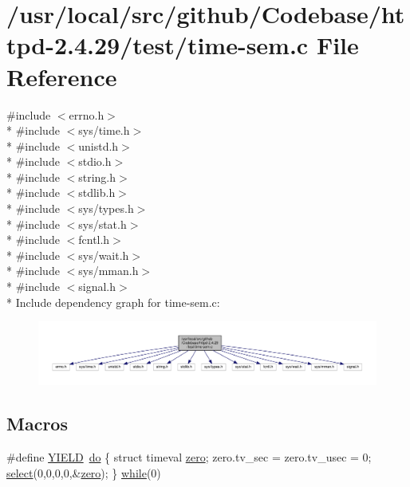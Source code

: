\hypertarget{time-sem_8c}{}\section{/usr/local/src/github/\+Codebase/httpd-\/2.4.29/test/time-\/sem.c File Reference}
\label{time-sem_8c}
{\ttfamily \#include $<$errno.\+h$>$}\\*
{\ttfamily \#include $<$sys/time.\+h$>$}\\*
{\ttfamily \#include $<$unistd.\+h$>$}\\*
{\ttfamily \#include $<$stdio.\+h$>$}\\*
{\ttfamily \#include $<$string.\+h$>$}\\*
{\ttfamily \#include $<$stdlib.\+h$>$}\\*
{\ttfamily \#include $<$sys/types.\+h$>$}\\*
{\ttfamily \#include $<$sys/stat.\+h$>$}\\*
{\ttfamily \#include $<$fcntl.\+h$>$}\\*
{\ttfamily \#include $<$sys/wait.\+h$>$}\\*
{\ttfamily \#include $<$sys/mman.\+h$>$}\\*
{\ttfamily \#include $<$signal.\+h$>$}\\*
Include dependency graph for time-\/sem.c\+:
\nopagebreak
\begin{figure}[H]
\begin{center}
\leavevmode
\includegraphics[width=350pt]{time-sem_8c__incl}
\end{center}
\end{figure}
\subsection*{Macros}
\begin{DoxyCompactItemize}
\item 
\#define \hyperlink{time-sem_8c_a50d551776c26c1579754521287f0b0f0}{Y\+I\+E\+LD}~\hyperlink{pcregrep_8txt_a29df1716374a8e3439d34a27760970bd}{do} \{ struct timeval \hyperlink{pcre_8txt_a7aaf617d8e6fff870079bc583f7f8c22}{zero}; zero.\+tv\+\_\+sec = zero.\+tv\+\_\+usec = 0; \hyperlink{apr__arch__os2calls_8h_a2b406456012f9f74aeb33de6f3df053c}{select}(0,0,0,0,\&\hyperlink{pcre_8txt_a7aaf617d8e6fff870079bc583f7f8c22}{zero}); \} \hyperlink{tcpdumpscii_8txt_a4fdd7aa2abd5a87923ce470d2bdf6eb4}{while}(0)
\end{DoxyCompactItemize}
